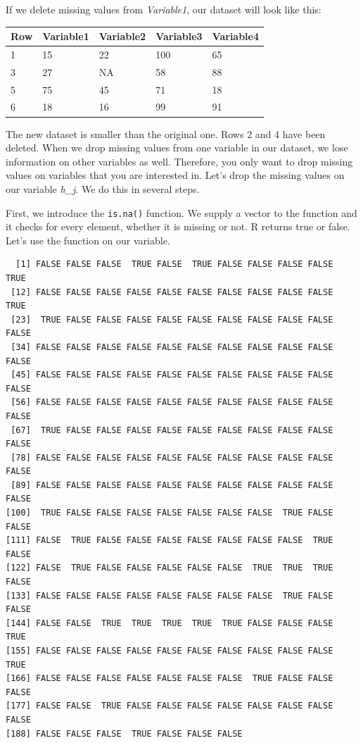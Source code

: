 \documentclass[]{article}
\newenvironment{Shaded}{\begin{snugshade}}{\end{snugshade}}
\newcommand{\KeywordTok}[1]{\textcolor[rgb]{0.13,0.29,0.53}{\textbf{#1}}}
\newcommand{\OperatorTok}[1]{\textcolor[rgb]{0.81,0.36,0.00}{\textbf{#1}}}
\newcommand{\NormalTok}[1]{#1}
\theoremstyle{definition}
\theoremstyle{definition}
\theoremstyle{definition}
\theoremstyle{remark}
\begin{document}
If we delete missing values from \emph{Variable1}, our dataset will look
like this:

\begin{tabular}{l|l|l|l|l}
\hline
Row & Variable1 & Variable2 & Variable3 & Variable4\\
\hline
1 & 15 & 22 & 100 & 65\\
\hline
3 & 27 & NA & 58 & 88\\
\hline
5 & 75 & 45 & 71 & 18\\
\hline
6 & 18 & 16 & 99 & 91\\
\hline
\end{tabular}

The new dataset is smaller than the original one. Rows 2 and 4 have been
deleted. When we drop missing values from one variable in our dataset,
we lose information on other variables as well. Therefore, you only want
to drop missing values on variables that you are interested in. Let's
drop the missing values on our variable \emph{h\_j}. We do this in
several steps.

First, we introduce the \texttt{is.na()} function. We supply a vector to
the function and it checks for every element, whether it is missing or
not. R returns true or false. Let's use the function on our variable.

\begin{Shaded}
\end{Shaded}

\begin{verbatim}
  [1] FALSE FALSE FALSE  TRUE FALSE  TRUE FALSE FALSE FALSE FALSE  TRUE
 [12] FALSE FALSE FALSE FALSE FALSE FALSE FALSE FALSE FALSE FALSE  TRUE
 [23]  TRUE FALSE FALSE FALSE FALSE FALSE FALSE FALSE FALSE FALSE FALSE
 [34] FALSE FALSE FALSE FALSE FALSE FALSE FALSE FALSE FALSE FALSE FALSE
 [45] FALSE FALSE FALSE FALSE FALSE FALSE FALSE FALSE FALSE FALSE FALSE
 [56] FALSE FALSE FALSE FALSE FALSE FALSE FALSE FALSE FALSE FALSE FALSE
 [67]  TRUE FALSE FALSE FALSE FALSE FALSE FALSE FALSE FALSE FALSE FALSE
 [78] FALSE FALSE FALSE FALSE FALSE FALSE FALSE FALSE FALSE FALSE FALSE
 [89] FALSE FALSE FALSE FALSE FALSE FALSE FALSE FALSE FALSE FALSE FALSE
[100]  TRUE FALSE FALSE FALSE FALSE FALSE FALSE FALSE  TRUE FALSE FALSE
[111] FALSE  TRUE FALSE FALSE FALSE FALSE FALSE FALSE FALSE  TRUE FALSE
[122] FALSE  TRUE FALSE FALSE FALSE FALSE FALSE  TRUE  TRUE  TRUE FALSE
[133] FALSE FALSE FALSE FALSE FALSE FALSE FALSE FALSE  TRUE FALSE FALSE
[144] FALSE FALSE  TRUE  TRUE  TRUE  TRUE  TRUE FALSE FALSE FALSE  TRUE
[155] FALSE FALSE FALSE FALSE FALSE FALSE FALSE FALSE FALSE FALSE  TRUE
[166] FALSE FALSE FALSE FALSE FALSE FALSE FALSE  TRUE FALSE FALSE FALSE
[177] FALSE FALSE  TRUE FALSE FALSE FALSE FALSE FALSE FALSE FALSE FALSE
[188] FALSE FALSE FALSE  TRUE FALSE FALSE FALSE
\end{verbatim}
\end{document}
